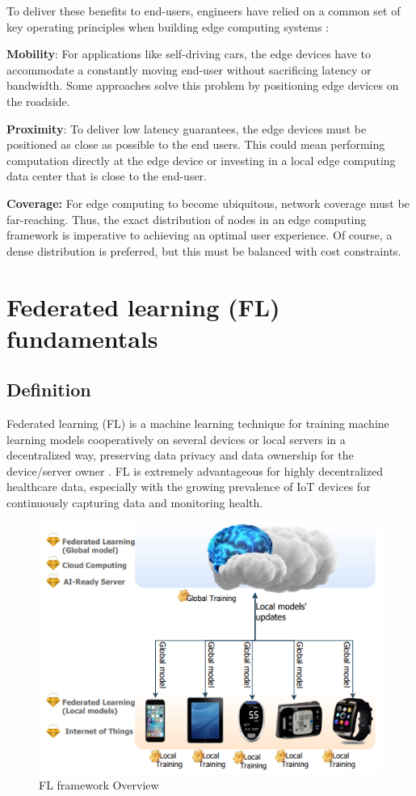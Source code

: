 To deliver these benefits to end-users, engineers have relied on a common set of key operating principles when building edge computing systems \cite{khan2019edge}:

\textbf{Mobility}: For applications like self-driving cars, the edge devices have to accommodate a constantly moving end-user without sacrificing latency or bandwidth. Some approaches solve this problem by positioning edge devices on the roadside.


\textbf{Proximity}: To deliver low latency guarantees, the edge devices must be positioned as close as possible to the end users. This could mean performing computation directly at the edge device or investing in a local edge computing data center that is close to the end-user.

\textbf{Coverage:} For edge computing to become ubiquitous, network coverage must be far-reaching. Thus, the exact distribution of nodes in an edge computing framework is imperative to achieving an optimal user experience. Of course, a dense distribution is preferred, but this must be balanced with cost constraints.



\section{Federated learning (FL) fundamentals} \label{4fedlea}

\subsection{Definition}
Federated learning (FL) is a machine learning technique for training machine learning models cooperatively on several devices or local servers in a decentralized way, preserving data privacy and data ownership for the device/server owner \cite{fl8}. FL is extremely advantageous for highly decentralized healthcare data, especially with the growing prevalence of IoT devices for continuously capturing data and monitoring health.


\begin{figure}[H]
\centering
\includegraphics[scale=0.6]{img/fl_overview.png}
\caption{FL framework Overview}
\label{fig:fl_overview}
\end{figure}

